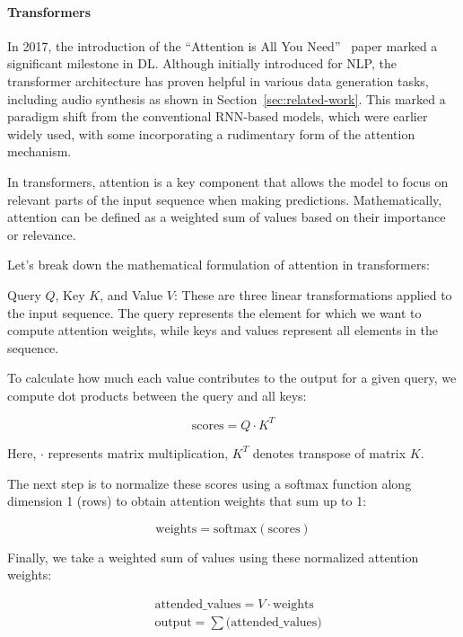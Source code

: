 \paragraph{Transformers} \label{sec:transformers}

In 2017, the introduction of the ``Attention is All You Need''~\cite{vaswani_attention_2017} paper marked a significant milestone in \ac{DL}. Although initially introduced for \ac{NLP}, the transformer architecture has proven helpful in various data generation tasks, including audio synthesis as shown in Section~\ref{sec:related-work}. This marked a paradigm shift from the conventional \ac{RNN}-based models, which were earlier widely used, with some incorporating a rudimentary form of the attention mechanism.

In transformers, attention is a key component that allows the model to focus on relevant parts of the input sequence when making predictions. Mathematically, attention can be defined as a weighted sum of values based on their importance or relevance.

Let's break down the mathematical formulation of attention in transformers:

Query \(Q\), Key \(K\), and Value \(V\): These are three linear transformations applied to the input sequence. The query represents the element for which we want to compute attention weights, while keys and values represent all elements in the sequence.

To calculate how much each value contributes to the output for a given query, we compute dot products between the query and all keys:

\begin{equation}
    \text{{scores}} = Q \cdot K^T
\end{equation}

Here, \(\cdot\) represents matrix multiplication, \(K^T\) denotes transpose of matrix \(K\).

The next step is to normalize these scores using a softmax function along dimension 1 (rows) to obtain attention weights that sum up to 1:

\begin{equation}
    \text{{weights}} = \text{{softmax}}(\text{{scores}})
\end{equation}

Finally, we take a weighted sum of values using these normalized attention weights:

\begin{equation}
\begin{split}
    &\text{{attended\_values}} = V \cdot {\text{{weights}}} \\
    &\text{{output}} = {\sum{( {\text{attended\_values} } })}
\end{split}
\end{equation}

